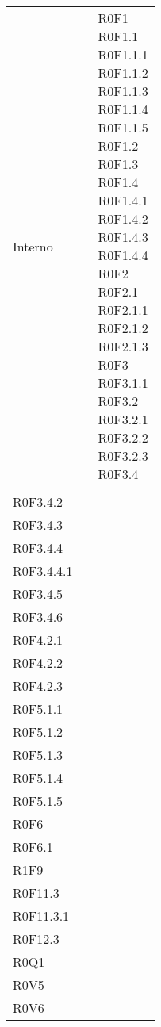\documentclass[AnalisiDeiRequisiti.tex]{subfiles}
\begin{document}
\begin{longtable}[H]{p{2cm}p{5cm}p{5cm}}
	\rowcolor{CRighePari}
	Interno & & \makecell[tl]{ R0F1 \\
	 R0F1.1 \\
	 R0F1.1.1 \\
	 R0F1.1.2 \\
	 R0F1.1.3 \\
	 R0F1.1.4 \\
	 R0F1.1.5 \\
	 R0F1.2 \\
	 R0F1.3 \\
	 R0F1.4 \\
	 R0F1.4.1 \\
	 R0F1.4.2 \\
	 R0F1.4.3 \\
	 R0F1.4.4 \\
	 R0F2 \\
	 R0F2.1 \\
	 R0F2.1.1 \\
	 R0F2.1.2 \\
	 R0F2.1.3 \\
	 R0F3 \\
	 R0F3.1.1 \\
	 R0F3.2 \\
	 R0F3.2.1 \\
	 R0F3.2.2 \\
	 R0F3.2.3 \\
	 R0F3.4 
	} \\
	& & \makecell[tl]{ %
	 R0F3.4.1 \\
	 R0F3.4.2 \\
	 R0F3.4.3 \\
	 R0F3.4.4 \\
	 R0F3.4.4.1 \\
	 R0F3.4.5 \\
	 R0F3.4.6 \\
	 R0F4.2.1 \\
	 R0F4.2.2 \\
	 R0F4.2.3 \\
	 R0F5.1.1 \\
	 R0F5.1.2 \\
	 R0F5.1.3 \\
	 R0F5.1.4 \\
	 R0F5.1.5 \\
	 R0F6 \\
	 R0F6.1 \\
	 R1F9 \\
	 R0F11.3 \\
	 R0F11.3.1 \\
	 R0F12.3 \\
	 R0Q1 \\
	 R0V5 \\
	 R0V6 } \\
	

\end{longtable}
\end{document}
